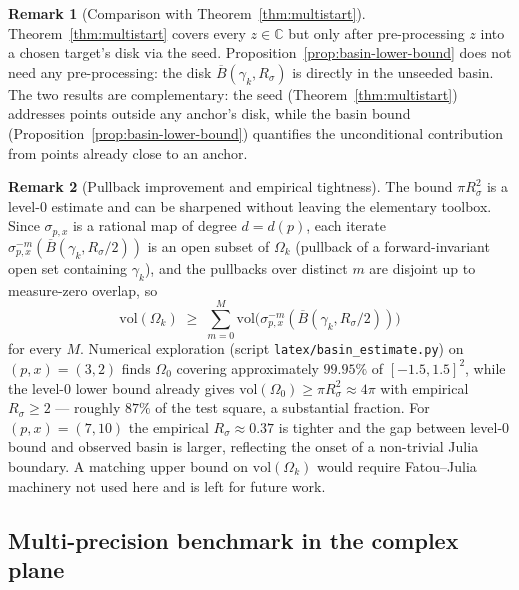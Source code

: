 \documentclass[11pt,a4paper]{article}
\theoremstyle{definition}
\newtheorem{remark}{Remark}[section]
\begin{document}
\begin{remark}[Comparison with Theorem~\ref{thm:multistart}]
Theorem~\ref{thm:multistart} covers every $z \in \mathbb{C}$ but only after pre-processing $z$ into a chosen target's disk via the seed. Proposition~\ref{prop:basin-lower-bound} does not need any pre-processing: the disk $\overline{B}(\gamma_k, R_\sigma)$ is directly in the unseeded basin. The two results are complementary: the seed (Theorem~\ref{thm:multistart}) addresses points outside any anchor's disk, while the basin bound (Proposition~\ref{prop:basin-lower-bound}) quantifies the unconditional contribution from points already close to an anchor.
\end{remark}

\begin{remark}[Pullback improvement and empirical tightness]\label{rem:pullback}
The bound $\pi R_\sigma^2$ is a level-$0$ estimate and can be sharpened without leaving the elementary toolbox. Since $\sigma_{p,x}$ is a rational map of degree $d = d(p)$, each iterate $\sigma_{p,x}^{-m}(\overline{B}(\gamma_k, R_\sigma/2))$ is an open subset of $\Omega_k$ (pullback of a forward-invariant open set containing $\gamma_k$), and the pullbacks over distinct $m$ are disjoint up to measure-zero overlap, so
\[
  \mathrm{vol}(\Omega_k) \;\geq\; \sum_{m=0}^{M} \mathrm{vol}\!\bigl(\sigma_{p,x}^{-m}(\overline{B}(\gamma_k, R_\sigma/2))\bigr)
\]
for every $M$. Numerical exploration (script \texttt{latex/basin\_estimate.py}) on $(p, x) = (3, 2)$ finds $\Omega_0$ covering approximately $99.95\%$ of $[-1.5, 1.5]^2$, while the level-$0$ lower bound already gives $\mathrm{vol}(\Omega_0) \geq \pi R_\sigma^2 \approx 4\pi$ with empirical $R_\sigma \geq 2$ --- roughly $87\%$ of the test square, a substantial fraction. For $(p, x) = (7, 10)$ the empirical $R_\sigma \approx 0.37$ is tighter and the gap between level-$0$ bound and observed basin is larger, reflecting the onset of a non-trivial Julia boundary. A matching upper bound on $\mathrm{vol}(\Omega_k)$ would require Fatou--Julia machinery not used here and is left for future work.
\end{remark}

\subsection{Multi-precision benchmark in the complex plane}
\label{sec:benchmark-complex}
\end{document}

